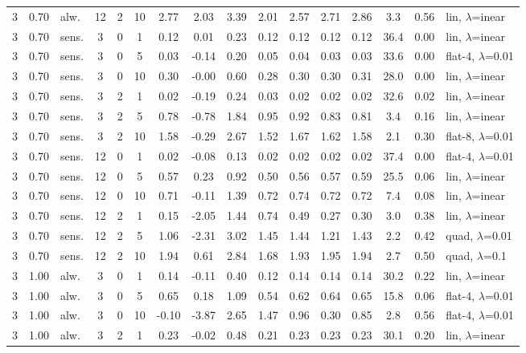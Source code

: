 \documentclass[10pt]{article}
\begin{document}
\begin{scriptsize}
\begin{longtable}{cclcc c ccc ccc c cc l}
3 & 0.70 & alw. & 12 & 2 & 10 & 2.77 & 2.03 & 3.39 & 2.01 & 2.57 & 2.71 & 2.86 & 3.3 & 0.56 & lin, $\lambda$=inear \\
3 & 0.70 & sens. & 3 & 0 & 1 & 0.12 & 0.01 & 0.23 & 0.12 & 0.12 & 0.12 & 0.12 & 36.4 & 0.00 & lin, $\lambda$=inear \\
3 & 0.70 & sens. & 3 & 0 & 5 & 0.03 & -0.14 & 0.20 & 0.05 & 0.04 & 0.03 & 0.03 & 33.6 & 0.00 & flat-4, $\lambda$=0.01 \\
3 & 0.70 & sens. & 3 & 0 & 10 & 0.30 & -0.00 & 0.60 & 0.28 & 0.30 & 0.30 & 0.31 & 28.0 & 0.00 & lin, $\lambda$=inear \\
3 & 0.70 & sens. & 3 & 2 & 1 & 0.02 & -0.19 & 0.24 & 0.03 & 0.02 & 0.02 & 0.02 & 32.6 & 0.02 & lin, $\lambda$=inear \\
3 & 0.70 & sens. & 3 & 2 & 5 & 0.78 & -0.78 & 1.84 & 0.95 & 0.92 & 0.83 & 0.81 & 3.4 & 0.16 & lin, $\lambda$=inear \\
3 & 0.70 & sens. & 3 & 2 & 10 & 1.58 & -0.29 & 2.67 & 1.52 & 1.67 & 1.62 & 1.58 & 2.1 & 0.30 & flat-8, $\lambda$=0.01 \\
3 & 0.70 & sens. & 12 & 0 & 1 & 0.02 & -0.08 & 0.13 & 0.02 & 0.02 & 0.02 & 0.02 & 37.4 & 0.00 & flat-4, $\lambda$=0.01 \\
3 & 0.70 & sens. & 12 & 0 & 5 & 0.57 & 0.23 & 0.92 & 0.50 & 0.56 & 0.57 & 0.59 & 25.5 & 0.06 & lin, $\lambda$=inear \\
3 & 0.70 & sens. & 12 & 0 & 10 & 0.71 & -0.11 & 1.39 & 0.72 & 0.74 & 0.72 & 0.72 & 7.4 & 0.08 & lin, $\lambda$=inear \\
3 & 0.70 & sens. & 12 & 2 & 1 & 0.15 & -2.05 & 1.44 & 0.74 & 0.49 & 0.27 & 0.30 & 3.0 & 0.38 & lin, $\lambda$=inear \\
3 & 0.70 & sens. & 12 & 2 & 5 & 1.06 & -2.31 & 3.02 & 1.45 & 1.44 & 1.21 & 1.43 & 2.2 & 0.42 & quad, $\lambda$=0.01 \\
3 & 0.70 & sens. & 12 & 2 & 10 & 1.94 & 0.61 & 2.84 & 1.68 & 1.93 & 1.95 & 1.94 & 2.7 & 0.50 & quad, $\lambda$=0.1 \\
3 & 1.00 & alw. & 3 & 0 & 1 & 0.14 & -0.11 & 0.40 & 0.12 & 0.14 & 0.14 & 0.14 & 30.2 & 0.22 & lin, $\lambda$=inear \\
3 & 1.00 & alw. & 3 & 0 & 5 & 0.65 & 0.18 & 1.09 & 0.54 & 0.62 & 0.64 & 0.65 & 15.8 & 0.06 & flat-4, $\lambda$=0.01 \\
3 & 1.00 & alw. & 3 & 0 & 10 & -0.10 & -3.87 & 2.65 & 1.47 & 0.96 & 0.30 & 0.85 & 2.8 & 0.56 & flat-4, $\lambda$=0.01 \\
3 & 1.00 & alw. & 3 & 2 & 1 & 0.23 & -0.02 & 0.48 & 0.21 & 0.23 & 0.23 & 0.23 & 30.1 & 0.20 & lin, $\lambda$=inear \\

\end{longtable}
\end{scriptsize}
\end{document}

